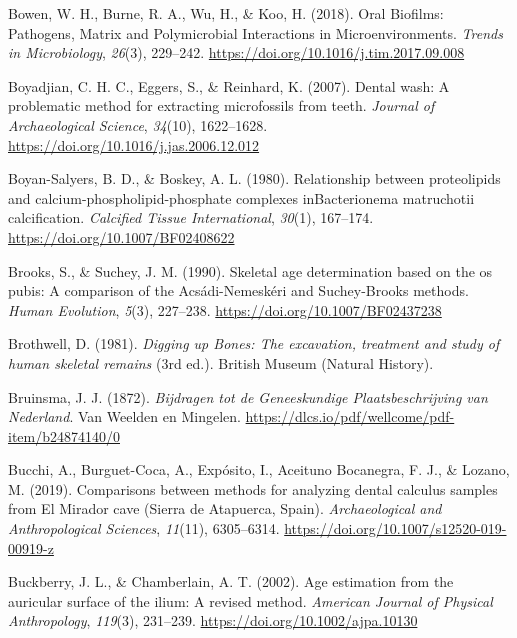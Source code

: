 \documentclass[
  letterpaper,
]{book}
\newlength{\cslhangindent}
\newlength{\cslentryspacingunit} %
\newenvironment{CSLReferences}[2] %
 {%
  \setlength{\parindent}{0pt}
  \ifodd #1
  \let\oldpar\par
  \def\par{\hangindent=\cslhangindent\oldpar}
  \fi
  \setlength{\parskip}{#2\cslentryspacingunit}
 }%
 {}
\begin{document}
\begin{CSLReferences}{1}{0}
\leavevmode{}%
Bowen, W. H., Burne, R. A., Wu, H., \& Koo, H. (2018). Oral {Biofilms}:
{Pathogens}, {Matrix} and {Polymicrobial Interactions} in
{Microenvironments}. \emph{Trends in Microbiology}, \emph{26}(3),
229--242. \url{https://doi.org/10.1016/j.tim.2017.09.008}

\leavevmode{}%
Boyadjian, C. H. C., Eggers, S., \& Reinhard, K. (2007). Dental wash: A
problematic method for extracting microfossils from teeth. \emph{Journal
of Archaeological Science}, \emph{34}(10), 1622--1628.
\url{https://doi.org/10.1016/j.jas.2006.12.012}

\leavevmode{}%
Boyan-Salyers, B. D., \& Boskey, A. L. (1980). Relationship between
proteolipids and calcium-phospholipid-phosphate complexes
{inBacterionema} matruchotii calcification. \emph{Calcified Tissue
International}, \emph{30}(1), 167--174.
\url{https://doi.org/10.1007/BF02408622}

\leavevmode{}%
Brooks, S., \& Suchey, J. M. (1990). Skeletal age determination based on
the os pubis: {A} comparison of the {Acsádi-Nemeskéri} and
{Suchey-Brooks} methods. \emph{Human Evolution}, \emph{5}(3), 227--238.
\url{https://doi.org/10.1007/BF02437238}

\leavevmode{}%
Brothwell, D. (1981). \emph{Digging up {Bones}: {The} excavation,
treatment and study of human skeletal remains} (3rd ed.). {British
Museum (Natural History)}.

\leavevmode{}%
Bruinsma, J. J. (1872). \emph{Bijdragen tot de {Geneeskundige
Plaatsbeschrijving} van {Nederland}}. {Van Weelden en Mingelen}.
\url{https://dlcs.io/pdf/wellcome/pdf-item/b24874140/0}

\leavevmode{}%
Bucchi, A., Burguet-Coca, A., Expósito, I., Aceituno Bocanegra, F. J.,
\& Lozano, M. (2019). Comparisons between methods for analyzing dental
calculus samples from {El Mirador} cave ({Sierra} de {Atapuerca},
{Spain}). \emph{Archaeological and Anthropological Sciences},
\emph{11}(11), 6305--6314.
\url{https://doi.org/10.1007/s12520-019-00919-z}

\leavevmode{}%
Buckberry, J. L., \& Chamberlain, A. T. (2002). Age estimation from the
auricular surface of the ilium: A revised method. \emph{American Journal
of Physical Anthropology}, \emph{119}(3), 231--239.
\url{https://doi.org/10.1002/ajpa.10130}


\end{CSLReferences}
\end{document}
